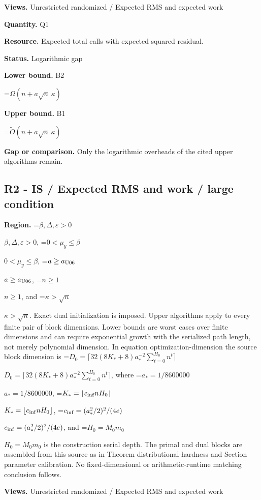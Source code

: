 \documentclass[10pt,a4paper]{article}
\newcommand{\AtlasMath}[1]{\par\begingroup\centering\setbox0=\hbox{$\displaystyle #1$}\ifdim\wd0>1.4\linewidth\typeout{ATLAS WIDE FORMULA: \the\wd0}\fi\ifdim\wd0>\linewidth\resizebox{\linewidth}{!}{\box0}\else\box0\fi\par\endgroup}
\newcommand{\AtlasInlineMath}[1]{\begingroup\setbox0=\hbox{$#1$}\ifdim\wd0>.4\linewidth\endgroup\AtlasMath{#1}\else\endgroup$#1$\fi}
\begin{document}
\textbf{Views.} Unrestricted randomized / Expected RMS and expected work



\textbf{Quantity.} Q1



\textbf{Resource.} Expected total calls with expected squared residual.



\textbf{Status.} Logarithmic gap



\textbf{Lower bound.} B2



\AtlasMath{\Omega(n+a\sqrt n\,\kappa)}


\textbf{Upper bound.} B1



\AtlasMath{\widetilde O(n+a\sqrt n\,\kappa)}


\textbf{Gap or comparison.} Only the logarithmic overheads of the cited upper algorithms remain.



\subsection{R2 - IS / Expected RMS and work / large condition}


\textbf{Region.} \AtlasInlineMath{\beta,\Delta,\varepsilon>0}, \AtlasInlineMath{0<\mu_y\le\beta}, \AtlasInlineMath{a\ge a_{\rm U06}}, \AtlasInlineMath{n\ge1}, and \AtlasInlineMath{\kappa>\sqrt n}. Exact dual initialization is imposed. Upper algorithms apply to every finite pair of block dimensions. Lower bounds are worst cases over finite dimensions and can require exponential growth with the serialized path length, not merely polynomial dimension. In equation optimization-dimension the source block dimension is \AtlasInlineMath{D_0=\lceil32(8K_*+8)a_*^{-2}\sum_{t=0}^{H_0}n^t\rceil}, where \AtlasInlineMath{a_*=1/8600000}, \AtlasInlineMath{K_*=\lfloor c_{\rm inf}nH_0\rfloor}, \AtlasInlineMath{c_{\rm inf}=(a_*^2/2)^2/(4e)}, and \AtlasInlineMath{H_0=M_0m_0} is the construction serial depth. The primal and dual blocks are assembled from this source as in Theorem distributional-hardness and Section parameter calibration. No fixed-dimensional or arithmetic-runtime matching conclusion follows.



\textbf{Views.} Unrestricted randomized / Expected RMS and expected work
\end{document}
